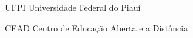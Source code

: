 \begin{siglas}
  \item[UFPI] Universidade Federal do Piauí
  \item[CEAD] Centro de Educação Aberta e a Distância
\end{siglas}